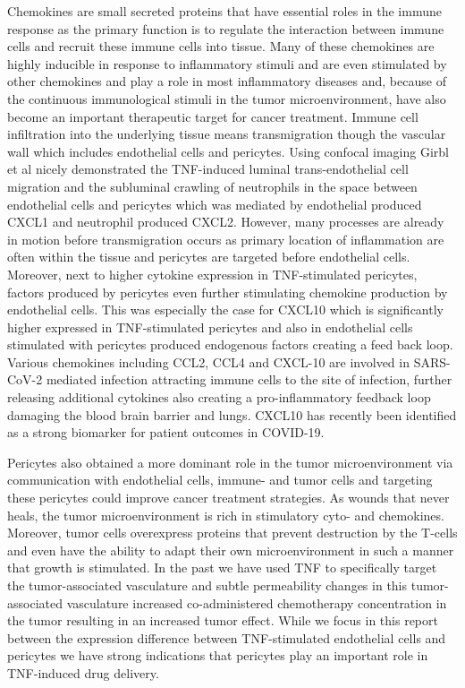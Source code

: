 Chemokines are small secreted proteins that have essential roles in the immune response as the primary function is to regulate the interaction between immune cells and recruit these immune cells into tissue\cite{Hughes_2018}. Many of these chemokines are highly inducible in response to inflammatory stimuli and are even stimulated by other chemokines and play a role in most inflammatory diseases and, because of the continuous immunological stimuli in the tumor microenvironment, have also become an important therapeutic target for cancer treatment\cite{Li_2022}. Immune cell infiltration into the underlying tissue means transmigration though the vascular wall which includes endothelial cells and pericytes. Using confocal imaging Girbl et al nicely demonstrated the TNF-induced luminal trans-endothelial cell migration and the subluminal crawling of neutrophils in the space between endothelial cells and pericytes which was mediated by endothelial produced CXCL1 and neutrophil produced CXCL2\cite{Girbl_2018,Li_2022}. However, many processes are already in motion before transmigration occurs as primary location of inflammation are often within the tissue and pericytes are targeted before endothelial cells. Moreover, next to higher cytokine expression in TNF-stimulated pericytes, factors produced by pericytes even further stimulating chemokine production by endothelial cells. This was especially the case for CXCL10 which is significantly higher expressed in TNF-stimulated pericytes and also in endothelial cells stimulated with pericytes produced endogenous factors creating a feed back loop. Various chemokines including CCL2, CCL4 and CXCL-10 are involved in SARS-CoV-2 mediated infection attracting immune cells to the site of infection, further releasing additional cytokines also creating a pro-inflammatory feedback loop damaging the blood brain barrier and lungs\cite{Jakhmola_2020,Khalil_2021}. CXCL10 has recently been identified as a strong biomarker for patient outcomes in COVID-19\cite{Lor__2021}.

Pericytes also obtained a more dominant role in the tumor microenvironment via communication with endothelial cells, immune- and tumor cells and targeting these pericytes could improve cancer treatment strategies. As wounds that never heals, the tumor microenvironment is rich in stimulatory cyto- and chemokines. Moreover, tumor cells overexpress proteins that prevent destruction by the T-cells and even have the ability to adapt their own microenvironment in such a manner that growth is stimulated\cite{Wargo_2016}. In the past we have used TNF to specifically target the tumor-associated vasculature and subtle permeability changes in this tumor-associated vasculature increased co-administered chemotherapy concentration in the tumor resulting in an increased tumor effect\cite{Seynhaeve_2007}. While we focus in this report between the expression difference between TNF-stimulated endothelial cells and pericytes we have strong indications that pericytes play an important role in TNF-induced drug delivery.

